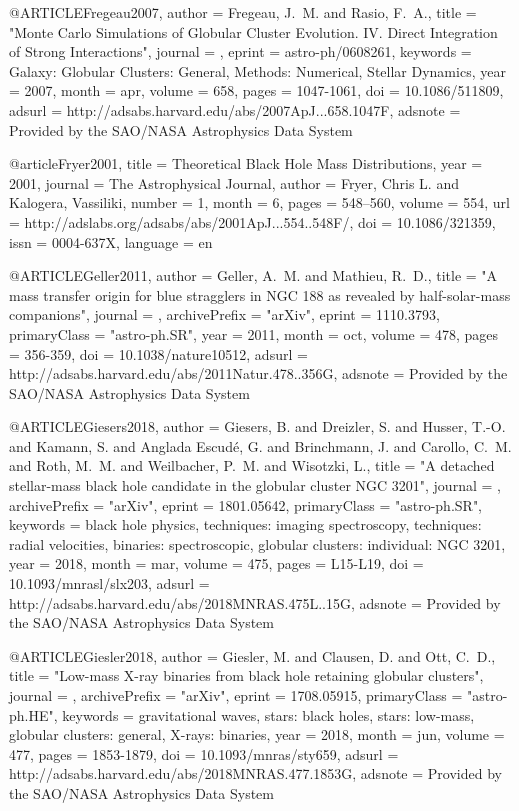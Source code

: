 \documentclass[twocolumn,tighten]{aastex63}
\begin{document}
{{{{{{@ARTICLE{Fregeau2007,
   author = {{Fregeau}, J.~M. and {Rasio}, F.~A.},
    title = "{Monte Carlo Simulations of Globular Cluster Evolution. IV. Direct Integration of Strong Interactions}",
  journal = {\apj},
   eprint = {astro-ph/0608261},
 keywords = {Galaxy: Globular Clusters: General, Methods: Numerical, Stellar Dynamics},
     year = 2007,
    month = apr,
   volume = 658,
    pages = {1047-1061},
      doi = {10.1086/511809},
   adsurl = {http://adsabs.harvard.edu/abs/2007ApJ...658.1047F},
  adsnote = {Provided by the SAO/NASA Astrophysics Data System}
}

@article{Fryer2001,
    title = {{Theoretical Black Hole Mass Distributions}},
    year = {2001},
    journal = {The Astrophysical Journal},
    author = {Fryer, Chris L. and Kalogera, Vassiliki},
    number = {1},
    month = {6},
    pages = {548--560},
    volume = {554},
    url = {http://adslabs.org/adsabs/abs/2001ApJ...554..548F/},
    doi = {10.1086/321359},
    issn = {0004-637X},
    language = {en}
}

@ARTICLE{Geller2011,
   author = {{Geller}, A.~M. and {Mathieu}, R.~D.},
    title = "{A mass transfer origin for blue stragglers in NGC 188 as revealed by half-solar-mass companions}",
  journal = {\nat},
archivePrefix = "arXiv",
   eprint = {1110.3793},
 primaryClass = "astro-ph.SR",
     year = 2011,
    month = oct,
   volume = 478,
    pages = {356-359},
      doi = {10.1038/nature10512},
   adsurl = {http://adsabs.harvard.edu/abs/2011Natur.478..356G},
  adsnote = {Provided by the SAO/NASA Astrophysics Data System}
}

@ARTICLE{Giesers2018,
   author = {{Giesers}, B. and {Dreizler}, S. and {Husser}, T.-O. and {Kamann}, S. and 
	{Anglada Escud{\'e}}, G. and {Brinchmann}, J. and {Carollo}, C.~M. and 
	{Roth}, M.~M. and {Weilbacher}, P.~M. and {Wisotzki}, L.},
    title = "{A detached stellar-mass black hole candidate in the globular cluster NGC 3201}",
  journal = {\mnras},
archivePrefix = "arXiv",
   eprint = {1801.05642},
 primaryClass = "astro-ph.SR",
 keywords = {black hole physics, techniques: imaging spectroscopy, techniques: radial velocities, binaries: spectroscopic, globular clusters: individual: NGC 3201},
     year = 2018,
    month = mar,
   volume = 475,
    pages = {L15-L19},
      doi = {10.1093/mnrasl/slx203},
   adsurl = {http://adsabs.harvard.edu/abs/2018MNRAS.475L..15G},
  adsnote = {Provided by the SAO/NASA Astrophysics Data System}
}

@ARTICLE{Giesler2018,
   author = {{Giesler}, M. and {Clausen}, D. and {Ott}, C.~D.},
    title = "{Low-mass X-ray binaries from black hole retaining globular clusters}",
  journal = {\mnras},
archivePrefix = "arXiv",
   eprint = {1708.05915},
 primaryClass = "astro-ph.HE",
 keywords = {gravitational waves, stars: black holes, stars: low-mass, globular clusters: general, X-rays: binaries},
     year = 2018,
    month = jun,
   volume = 477,
    pages = {1853-1879},
      doi = {10.1093/mnras/sty659},
   adsurl = {http://adsabs.harvard.edu/abs/2018MNRAS.477.1853G},
  adsnote = {Provided by the SAO/NASA Astrophysics Data System}
}

}}}}}}
\end{document}
